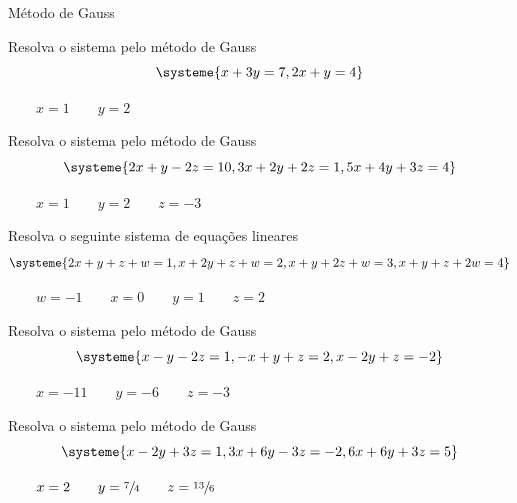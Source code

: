 \begin{exercicios}{Método de Gauss}

    \begin{exercicio}
        Resolva o sistema pelo método de Gauss
        \[ \systeme{  x + 3y = 7,
                     2x +  y = 4} 
        \]
        \begin{answers}
            \(\qquad x=1 \qquad y=2 \)
        \end{answers}
    \end{exercicio}
    
    \begin{exercicio}
        Resolva o sistema pelo método de Gauss
        \[\systeme{ 2x + y -2z = 10,
            3x +2y +2z =  1,
            5x +4y +3z =  4}
        \]
        \begin{answers}
            \(\qquad x=1 \qquad y=2 \qquad z=-3 \)
        \end{answers}
    \end{exercicio}
    
    \begin{exercicio}
        Resolva o seguinte sistema de equações lineares
        \[\systeme{2x +  y +  z +  w = 1,
            x + 2y +  z +  w = 2,
            x +  y + 2z +  w = 3,
            x +  y +  z + 2w = 4}
        \]
        \begin{answers}
            \(\qquad w=-1 \qquad x=0 \qquad y=1 \qquad z=2 \)
        \end{answers}
    \end{exercicio}
    
    \begin{exercicio}
        Resolva o sistema pelo método de Gauss
        \[\systeme{ x  -y -2z = 1,
            -x  +y + z = 2,
            x -2y + z =-2}
        \]
        \begin{answers}
            \(\qquad x=-11 \qquad y=-6 \qquad z=-3 \)
        \end{answers}
    \end{exercicio}
    
    \begin{exercicio}
        Resolva o sistema pelo método de Gauss
        \[\systeme{  x -2y +3z =  1,
            3x +6y -3z = -2,
            6x +6y +3z =  5}
        \]
        \begin{answers}
            \(\qquad x=2 \qquad y=\sfrac{7}{4} \qquad z=\sfrac{13}{6} \)
        \end{answers}
    \end{exercicio}
    

\end{exercicios}
